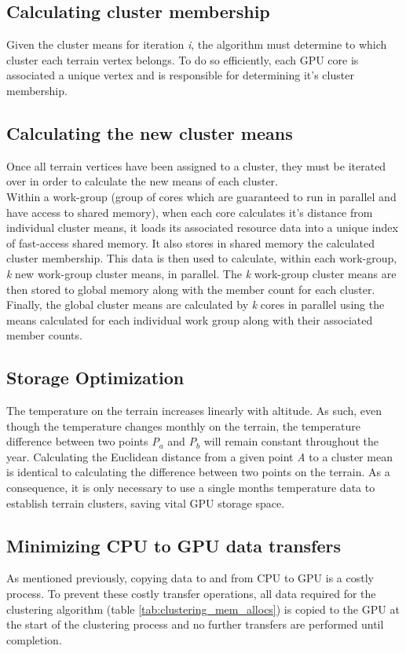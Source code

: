 \subsection{Calculating cluster membership}

Given the cluster means for iteration \textit{i}, the algorithm must determine to which cluster each terrain vertex belongs. To do so efficiently, each GPU core is associated a unique vertex and is responsible for determining it's cluster membership.

\subsection{Calculating the new cluster means}

Once all terrain vertices have been assigned to a cluster, they must be iterated over in order to calculate the new means of each cluster.\\

Within a work-group (group of cores which are guaranteed to run in parallel and have access to shared memory), when each core calculates it's distance from individual cluster means, it loads its associated resource data into a unique index of fast-access shared memory. It also stores in shared memory the calculated cluster membership. This data is then used to calculate, within each work-group, \textit{k} new work-group cluster means, in parallel. The \textit{k} work-group cluster means are then stored to global memory along with the member count for each cluster.\\

Finally, the global cluster means are calculated by \textit{k} cores in parallel using the means calculated for each individual work group along with their associated member counts.\\

\subsection{Storage Optimization}

The temperature on the terrain increases linearly with altitude. As such, even though the temperature changes monthly on the terrain, the temperature difference between two points \textit{P$_{a}$} and \textit{P$_{b}$} will remain constant throughout the year. Calculating the Euclidean distance from a given point \textit{A} to a cluster mean is identical to calculating the difference between two points on the terrain. As a consequence, it is only necessary to use a single months temperature data to establish terrain clusters, saving vital GPU storage space.

\subsection{Minimizing CPU to GPU data transfers}

As mentioned previously, copying data to and from CPU to GPU is a costly process. To prevent these costly transfer operations, all data required for the clustering algorithm (table \ref{tab:clustering_mem_allocs}) is copied to the GPU at the start of the clustering process and no further transfers are performed until completion. \\